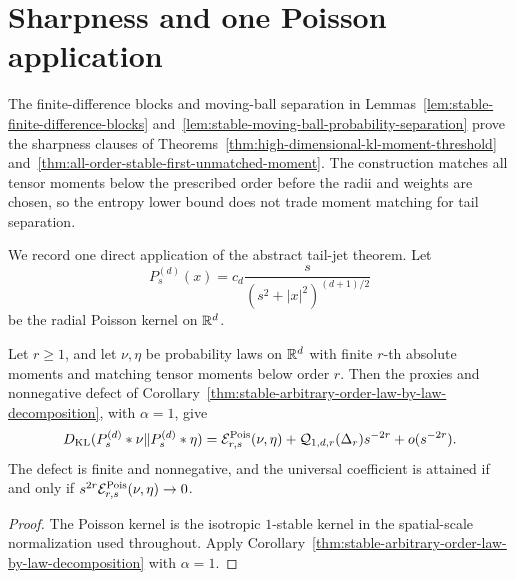 \section{Sharpness and one Poisson application}
\label{sec:sharpness-poisson-application}

The finite-difference blocks and moving-ball separation in
Lemmas~\ref{lem:stable-finite-difference-blocks}
and~\ref{lem:stable-moving-ball-probability-separation} prove the sharpness
clauses of Theorems~\ref{thm:high-dimensional-kl-moment-threshold}
and~\ref{thm:all-order-stable-first-unmatched-moment}.  The construction
matches all tensor moments below the prescribed order before the radii and
weights are chosen, so the entropy lower bound does not trade moment matching
for tail separation.

We record one direct application of the abstract tail-jet theorem.  Let
\[
 P_s^{(d)}(x)=c_d\frac{s}{(s^2+|x|^2)^{(d+1)/2}}
\]
be the radial Poisson kernel on \(\mathbb{R}^d\).

\begin{corollary}
\label{cor:poisson-positive-tail-jet-decomposition}
Let \(r\ge1\), and let \(\nu,\eta\) be probability laws on \(\mathbb{R}^d\) with
finite \(r\)-th absolute moments and matching tensor moments below order
\(r\).  Then the proxies and nonnegative defect of
Corollary~\ref{thm:stable-arbitrary-order-law-by-law-decomposition}, with
\(\alpha=1\), give
\[
 D_{\rm KL}(P_s^{(d)}*\nu\|P_s^{(d)}*\eta)
 =\mathcal E_{r,s}^{\rm Pois}(\nu,\eta)
  +\mathcal Q_{1,d,r}(\Delta_r)s^{-2r}+o(s^{-2r}).
\]
The defect is finite and nonnegative, and the universal coefficient is
attained if and only if
\(s^{2r}\mathcal E_{r,s}^{\rm Pois}(\nu,\eta)\to0\).
\end{corollary}

\begin{proof}
The Poisson kernel is the isotropic \(1\)-stable kernel in the spatial-scale
normalization used throughout.  Apply
Corollary~\ref{thm:stable-arbitrary-order-law-by-law-decomposition} with
\(\alpha=1\).
\end{proof}
